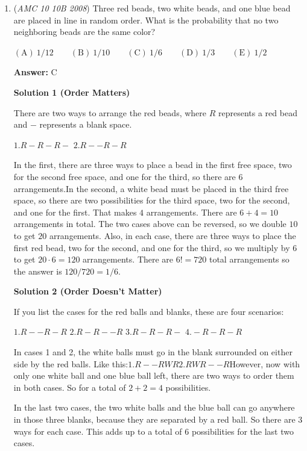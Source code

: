 \begin{enumerate}
 


	\item (\textit{AMC 10 10B 2008}) Three red beads, two white beads, and one blue bead are placed in line in random order. What is the probability that no two neighboring beads are the same color?


 $\mathrm{(A)}\ 1/12\qquad\mathrm{(B)}\ 1/10\qquad\mathrm{(C)}\ 1/6\qquad\mathrm{(D)}\ 1/3\qquad\mathrm{(E)}\ 1/2$

 \textbf{Answer: }C



\textbf{Solution 1 (Order Matters)}

There are two ways to arrange the red beads, where $R$ represents a red bead and $-$ represents a blank space.

 $1. R - R - R -$
$2. R - - R - R$

 In the first, there are three ways to place a bead in the first free space, two for the second free space, and one for the third, so there are $6$ arrangements.In the second, a white bead must be placed in the third free space, so there are two possibilities for the third space, two for the second, and one for the first. That makes $4$ arrangements. There are $6+4=10$ arrangements in total. The two cases above can be reversed, so we double $10$ to get $20$ arrangements. Also, in each case, there are three ways to place the first red bead, two for the second, and one for the third, so we multiply by $6$ to get $20\cdot 6 = 120$ arrangements. There are $6! = 720$ total arrangements so the answer is $120/720 = \boxed{1/6}$.

 



\textbf{Solution 2 (Order Doesn't Matter)}

If you list the cases for the red balls and blanks, these are four scenarios:

 $1. R - - R - R$
$2. R - R - - R$
$3. R - R - R -$
$4. - R - R - R$

 In cases 1 and 2, the white balls must go in the blank surrounded on either side by the red balls. Like this:$1. R - - R W R$$2. R W R - - R$However, now with only one white ball and one blue ball left, there are two ways to order them in both cases. So for a total of $2 + 2 = 4$ possibilities.

 In the last two cases, the two white balls and the blue ball can go anywhere in those three blanks, because they are separated by a red ball. So there are $3$ ways for each case. This adds up to a total of $6$ possibilities for the last two cases.


\end{enumerate}
